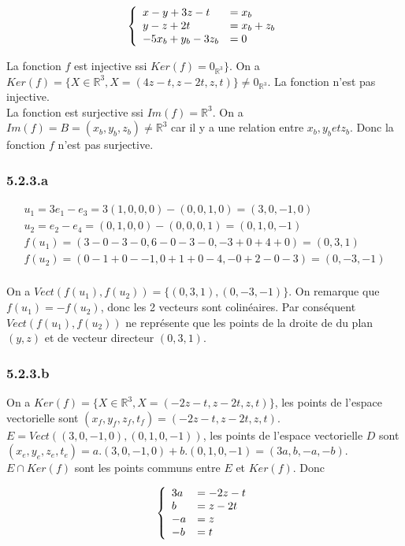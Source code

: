 \documentclass[]{book}
\theoremstyle{definition}
\newcommand{\bb}[1]{\mathbb{#1}}
\newcommand{\R}{\bb{R}}
\begin{document}
$$
\left\{ 
\begin{array}{l l}
x -y +3z -t & = x_b \\
y -z + 2t & = x_b+z_b \\
-5x_b +y_b -3 z_b & =  0 \\
\end{array}
\right. 
$$


La fonction $f$ est injective ssi $Ker(f) = 0_{\R^3}\}$. On a $Ker(f)= \{X \in \R^3, X=(4z-t,z-2t, z, t)\} \neq 0_{\R^3}$. La fonction n'est pas injective.\\

La fonction est surjective ssi $Im(f) = \R^3$. On a $Im(f) = B= (x_b,y_b,z_b) \neq \R^3$ car il y a une relation entre $x_b,y_b et z_b$. Donc la fonction $f$ n'est pas surjective.

\subsubsection*{5.2.3.a}	
$$
\begin{array}{l}
u_1 = 3e_1-e_3 = 3(1,0,0,0)-(0,0,1,0) = (3,0,-1,0) \\
u_2 = e_2 -e_4 = (0,1,0,0) - (0,0,0,1) = (0,1,0,-1) \\
f(u_1) = (3 - 0 -3 - 0, 6 - 0 -3 -0, -3 + 0 +4 +0)= (0, 3 ,1) \\
f(u_2) = (0-1+0--1, 0 +1 + 0 -4, -0 + 2 -0 -3) = (0,-3,-1) \\
\end{array}
$$

On a $Vect(f(u_1), f(u_2)) = \{(0,3,1),(0,-3,-1)\}$. On remarque que $f(u_1)=-f(u_2)$, donc les 2 vecteurs sont colin\'eaires. Par cons\'equent $Vect(f(u_1), f(u_2))$ ne repr\'esente que les points de la droite de du plan $(y,z)$ et de vecteur directeur $(0,3,1)$.

\subsubsection*{5.2.3.b}
On a $Ker(f)=\{X \in \R^3, X=(-2z-t,z-2t, z, t)\}$,  les points de l'espace vectorielle sont $(x_f,y_f,z_f,t_f) = (-2z-t,z-2t, z, t)$.\\
$E=Vect((3,0,-1,0), (0,1,0,-1))$, les points de l'espace vectorielle $D$ sont $(x_e,y_e,z_e,t_e) = a.(3,0,-1,0) + b.(0,1,0,-1) = (3a,b,-a,-b)$.\\

$E \cap Ker(f)$ sont les points communs entre $E$ et $Ker(f)$. Donc

$$
\left\{ 
\begin{array}{l l}
3a & = -2z - t \\
b & = z-2t \\
-a & = z \\
-b & = t \\
\end{array}
\right. 
$$
\end{document}
